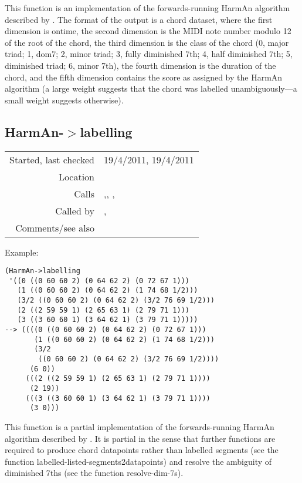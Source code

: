 \noindent This function is an implementation of the
forwards-running HarmAn algorithm described by
\cite{pardo2002}. The format of the output is a chord
dataset, where the first dimension is ontime, the
second dimension is the MIDI note number modulo 12 of
the root of the chord, the third dimension is the
class of the chord (0, major triad; 1, dom7; 2, minor
triad; 3, fully diminished 7th; 4, half diminished
7th; 5, diminished triad; 6, minor 7th), the fourth
dimension is the duration of the chord, and the
fifth dimension contains the score as assigned by the
HarmAn algorithm (a large weight suggests that the
chord was labelled unambiguously---a small weight
suggests otherwise).


\subsection*{HarmAn-$>$labelling}\label{fun:HarmAn->labelling}

\vspace{0.3cm}
\begin{tabular}{r|p{8cm}}
Started, last checked & 19/4/2011, 19/4/2011 \\
Location & \nameref{sec:chord-labelling} \\
Calls & \nameref{fun:max-argmax-of-segment-scores},\newline \nameref{fun:max-argmax-of-segments-score}, \nameref{fun:my-last},\newline \nameref{fun:nth-list-of-lists} \\
Called by & \nameref{fun:HarmAn->}, \nameref{fun:HarmAn->roman} \\
Comments/see also &
\end{tabular}

\vspace{0.5cm}
\noindent Example:
\begin{verbatim}
(HarmAn->labelling
 '((0 ((0 60 60 2) (0 64 62 2) (0 72 67 1)))
   (1 ((0 60 60 2) (0 64 62 2) (1 74 68 1/2)))
   (3/2 ((0 60 60 2) (0 64 62 2) (3/2 76 69 1/2)))
   (2 ((2 59 59 1) (2 65 63 1) (2 79 71 1)))
   (3 ((3 60 60 1) (3 64 62 1) (3 79 71 1)))))
--> ((((0 ((0 60 60 2) (0 64 62 2) (0 72 67 1)))
       (1 ((0 60 60 2) (0 64 62 2) (1 74 68 1/2)))
       (3/2
        ((0 60 60 2) (0 64 62 2) (3/2 76 69 1/2))))
      (6 0))
     (((2 ((2 59 59 1) (2 65 63 1) (2 79 71 1))))
      (2 19))
     (((3 ((3 60 60 1) (3 64 62 1) (3 79 71 1))))
      (3 0)))
\end{verbatim}

\noindent This function is a partial implementation of
the forwards-running HarmAn algorithm described by
\cite{pardo2002}. It is partial in the sense that
further functions are required to produce chord
datapoints rather than labelled segments (see the
function labelled-listed-segments2datapoints) and
resolve the ambiguity of diminished 7ths (see the
function resolve-dim-7s).



